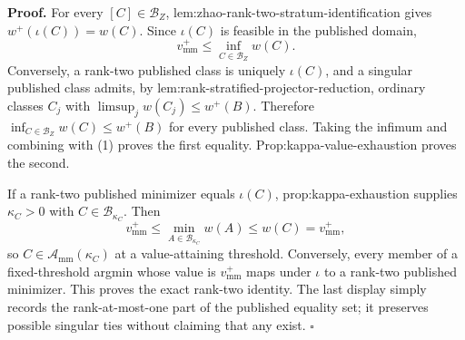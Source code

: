 \textbf{Proof.}
For every \([C]\in\mathcal B_Z\), lem:zhao-rank-two-stratum-identification gives \(w^+(\iota(C))=w(C)\).  Since \(\iota(C)\) is feasible in the published domain,
\[
 v_{\mathrm{mm}}^+\le\inf_{C\in\mathcal B_Z}w(C).
 \tag{1}
\]
Conversely, a rank-two published class is uniquely \(\iota(C)\), and a singular published class admits, by lem:rank-stratified-projector-reduction, ordinary classes \(C_j\) with \(\limsup_jw(C_j)\le w^+(B)\).  Therefore \(\inf_{C\in\mathcal B_Z}w(C)\le w^+(B)\) for every published class.  Taking the infimum and combining with (1) proves the first equality.  Prop:kappa-value-exhaustion proves the second.

If a rank-two published minimizer equals \(\iota(C)\), prop:kappa-exhaustion supplies \(\kappa_C>0\) with \(C\in\mathcal B_{\kappa_C}\).  Then
\[
 v_{\mathrm{mm}}^+
 \le\min_{A\in\mathcal B_{\kappa_C}}w(A)
 \le w(C)=v_{\mathrm{mm}}^+,
\]
so \(C\in\mathcal A_{\mathrm{mm}}(\kappa_C)\) at a value-attaining threshold.  Conversely, every member of a fixed-threshold argmin whose value is \(v_{\mathrm{mm}}^+\) maps under \(\iota\) to a rank-two published minimizer.  This proves the exact rank-two identity.  The last display simply records the rank-at-most-one part of the published equality set; it preserves possible singular ties without claiming that any exist. \(\square\)